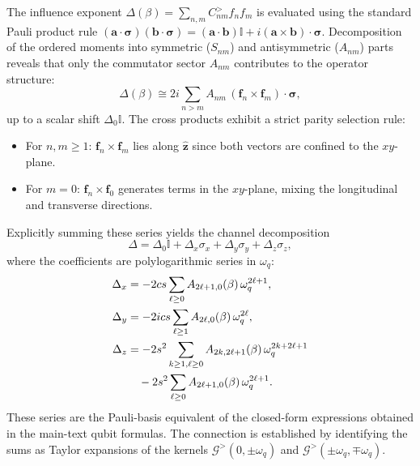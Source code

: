 The influence exponent $\Delta(\beta) = \sum_{n,m} C^>_{nm} f_n f_m$ is evaluated using the standard Pauli product rule $(\mathbf{a}\cdot\boldsymbol{\sigma})(\mathbf{b}\cdot\boldsymbol{\sigma}) = (\mathbf{a}\cdot\mathbf{b})\mathbb{I} + i(\mathbf{a}\times\mathbf{b})\cdot\boldsymbol{\sigma}$. Decomposition of the ordered moments into symmetric ($S_{nm}$) and antisymmetric ($A_{nm}$) parts reveals that only the commutator sector $A_{nm}$ contributes to the operator structure:
\begin{equation}
    \Delta(\beta) \cong 2i\sum_{n>m} A_{nm}\,(\mathbf{f}_n\times\mathbf{f}_m)\cdot\boldsymbol{\sigma},
    \label{eq:Delta_Pauli_Anm_appalg}
\end{equation}
up to a scalar shift $\Delta_0\mathbb{I}$. The cross products exhibit a strict parity selection rule:
\begin{itemize}
    \item For $n,m \ge 1$: $\mathbf{f}_n \times \mathbf{f}_m$ lies along $\hat{\mathbf{z}}$ since both vectors are confined to the $xy$-plane.
    \item For $m=0$: $\mathbf{f}_n \times \mathbf{f}_0$ generates terms in the $xy$-plane, mixing the longitudinal and transverse directions.
\end{itemize}
Explicitly summing these series yields the channel decomposition
\begin{equation}
    \Delta = \Delta_0\mathbb{I} + \Delta_x\sigma_x + \Delta_y\sigma_y + \Delta_z\sigma_z,
    \label{eq:Delta_xyz_form_appalg}
\end{equation}
where the coefficients are polylogarithmic series in $\omega_q$:
\begin{align}
    \Delta_x &= -2cs\sum_{\ell\ge0}A_{2\ell+1,0}(\beta)\,\omega_q^{2\ell+1}, \label{eq:Deltax_series_appalg}\\
    \Delta_y &= -2ics\sum_{\ell\ge1}A_{2\ell,0}(\beta)\,\omega_q^{2\ell}, \label{eq:Deltay_series_appalg}\\
    \Delta_z &= -2s^2\sum_{k\ge1,\ell\ge0}A_{2k,2\ell+1}(\beta)\,\omega_q^{2k+2\ell+1} \notag\\
             &\quad -2s^2\sum_{\ell\ge0}A_{2\ell+1,0}(\beta)\,\omega_q^{2\ell+1}. \label{eq:Deltaz_series_appalg}
\end{align}
These series are the Pauli-basis equivalent of the closed-form expressions obtained in the main-text qubit formulas. The connection is established by identifying the sums as Taylor expansions of the kernels $\mathcal{G}^>(0,\pm\omega_q)$ and $\mathcal{G}^>(\pm\omega_q,\mp\omega_q)$.

